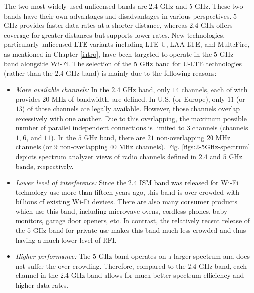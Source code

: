 The two most widely-used unlicensed bands are $2.4$ GHz and $5$ GHz. These two bands have their own advantages and disadvantages in various perspectives. $5$ GHz provides faster data rates at a shorter distance, whereas $2.4$ GHz offers coverage for greater distances but supports lower rates. New technologies, particularly unlicensed LTE variants including LTE-U, LAA-LTE, and MulteFire, as mentioned in Chapter \ref{intro}, have been targeted to operate in the $5$ GHz band alongside Wi-Fi. The selection of the $5$ GHz band for U-LTE technologies (rather than the $2.4$ GHz band) is mainly due to the following reasons:
\begin{itemize}
\item
\textit{More available channels:} In the $2.4$ GHz band, only $14$ channels, each of with provides $20$ MHz of bandwidth, are defined. In U.S. (or Europe), only $11$ (or $13$) of those channels are legally available. However, those channels overlap excessively with one another. Due to this overlapping, the maximum possible number of parallel independent connections is limited to $3$ channels (channels $1$, $6$, and $11$). In the $5$ GHz band, there are $21$ non-overlapping $20$ MHz channels (or $9$ non-overlapping $40$ MHz channels). Fig. \ref{figs:2-5GHz-spectrum} depicts spectrum analyzer views of radio channels defined in $2.4$ and $5$ GHz bands, respectively.
\item
\textit{Lower level of interference:} Since the $2.4$ ISM band was released for Wi-Fi technology use more than fifteen years ago, this band is over-crowded with billions of existing Wi-Fi devices. There are also many consumer products which use this band, including microwave ovens, cordless phones, baby monitors, garage door openers, etc. In contrast, the relatively recent release of the $5$ GHz band for private use makes this band much less crowded and thus having a much lower level of RFI. 
\item
\textit{Higher performance:} The $5$ GHz band operates on a larger spectrum and does not suffer the over-crowding. Therefore, compared to the $2.4$ GHz band, each channel in the $2.4$ GHz band allows for much better spectrum efficiency and higher data rates.
\end{itemize}

